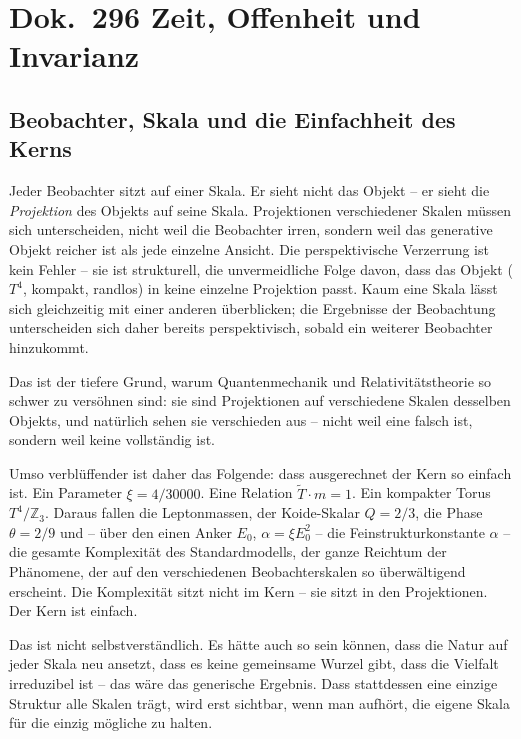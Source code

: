 
\section*{Dok.~296 \quad Zeit, Offenheit und Invarianz}

\subsection*{Beobachter, Skala und die Einfachheit des Kerns}

Jeder Beobachter sitzt auf einer Skala. Er sieht nicht das Objekt -- er
sieht die \emph{Projektion} des Objekts auf seine Skala. Projektionen
verschiedener Skalen müssen sich unterscheiden, nicht weil die Beobachter
irren, sondern weil das generative Objekt reicher ist als jede einzelne
Ansicht. Die perspektivische Verzerrung ist kein Fehler -- sie ist
strukturell, die unvermeidliche Folge davon, dass das Objekt ($T^4$,
kompakt, randlos) in keine einzelne Projektion passt. Kaum eine Skala lässt
sich gleichzeitig mit einer anderen überblicken; die Ergebnisse der
Beobachtung unterscheiden sich daher bereits perspektivisch, sobald ein
weiterer Beobachter hinzukommt.

Das ist der tiefere Grund, warum Quantenmechanik und Relativitätstheorie so
schwer zu versöhnen sind: sie sind Projektionen auf verschiedene Skalen
desselben Objekts, und natürlich sehen sie verschieden aus -- nicht weil
eine falsch ist, sondern weil keine vollständig ist.

Umso verblüffender ist daher das Folgende: dass ausgerechnet der Kern so
einfach ist. Ein Parameter $\xi = 4/30000$. Eine Relation $\tilde{T} \cdot
m = 1$. Ein kompakter Torus $T^4/\mathbb{Z}_3$. Daraus fallen die
Leptonmassen, der Koide-Skalar $Q = 2/3$, die Phase $\theta = 2/9$ und --
über den einen Anker $E_0$, $\alpha = \xi E_0^2$ -- die
Feinstrukturkonstante $\alpha$ -- die gesamte Komplexität des
Standardmodells, der ganze Reichtum der Phänomene, der auf den
verschiedenen Beobachterskalen so überwältigend erscheint. Die Komplexität
sitzt nicht im Kern -- sie sitzt in den Projektionen. Der Kern ist einfach.

Das ist nicht selbstverständlich. Es hätte auch so sein können, dass die
Natur auf jeder Skala neu ansetzt, dass es keine gemeinsame Wurzel gibt,
dass die Vielfalt irreduzibel ist -- das wäre das generische Ergebnis.
Dass stattdessen eine einzige Struktur alle Skalen trägt, wird erst
sichtbar, wenn man aufhört, die eigene Skala für die einzig mögliche zu
halten.

